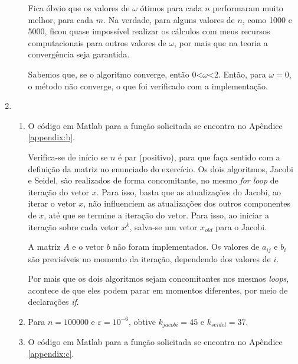 \documentclass{article}
\begin{document}
\begin{enumerate}
\begin{enumerate}
                    Fica óbvio que os valores de $\omega$ ótimos para cada $n$ performaram muito melhor, para cada $m$.
                    Na verdade, para alguns valores de $n$, como 1000 e 5000, ficou quase impossível realizar os cálculos com meus recursos computacionais para outros valores de $\omega$,
                    por mais que na teoria a convergência seja garantida.
                    
                    Sabemos que, se o algoritmo converge, então 0<$\omega$<2. Então, para $\omega=0$, o
                    método não converge, o que foi verificado com a implementação.
                    
            \end{enumerate}
            
        \item \begin{enumerate}
                \item O código em Matlab para a função solicitada se encontra no Apêndice \ref{appendix:b}.
                
                    Verifica-se de início se $n$ é par (positivo), para que faça sentido com a definição da matriz
                    no enunciado do exercício. Os dois algoritmos, Jacobi e Seidel, são realizados de forma concomitante,
                    no mesmo \textit{for loop} de iteração do vetor $x$. Para isso, basta que as atualizações do Jacobi, ao iterar o vetor $x$, não influenciem as atualizações
                    dos outros componentes de $x$, até que se termine a iteração do vetor. Para isso, ao iniciar a iteração sobre cada vetor $x^{k}$, salva-se um vetor
                    $x_{old}$ para o Jacobi.

                    A matriz $A$ e o vetor $b$ não foram implementados. Os valores de $a_{ij}$ e $b_i$ são previsíveis no momento
                    da iteração, dependendo dos valores de $i$.

                    Por mais que os dois algoritmos sejam concomitantes nos mesmos \textit{loops}, acontece de que eles podem parar em momentos diferentes,
                    por meio de declarações \textit{if}.

                \item Para $n=100000$ e $\varepsilon=10^{-6}$, obtive $k_{jacobi}=45$ e $k_{seidel}=37$.
                
                \item O código em Matlab para a função solicitada se encontra
                    no Apêndice \ref{appendix:c}.


\end{enumerate}
\end{enumerate}
\end{document}
